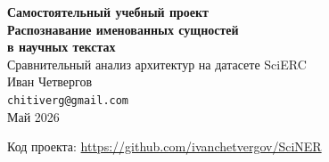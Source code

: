 \thispagestyle{empty}

\begin{center}
    {\large\bfseries Самостоятельный учебный проект}\\[2em]
    {\LARGE\bfseries Распознавание именованных сущностей\\в научных текстах}\\[1em]
    {\large Сравнительный анализ архитектур на датасете SciERC}\\[4em]
    {\large Иван Четвергов}\\[0.5em]
    {\normalsize \texttt{chitiverg@gmail.com}}\\[4em]
    {\normalsize Май 2026}
\end{center}

\vfill

\begin{center}
    \small
    Код проекта: \url{https://github.com/ivanchetvergov/SciNER}
\end{center}

\newpage
